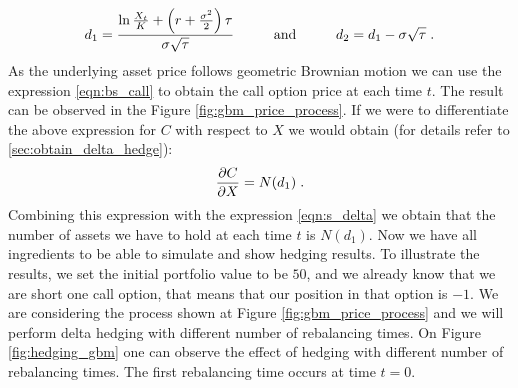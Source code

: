 \documentclass[times, utf8, diplomski]{fer}
\begin{document}
\begin{equation} \label{eqn:d1d2}
	d_1 = \frac{\ln{\frac{X_t}{K}} + \left(r + \frac{\sigma^2}{2} \right)\tau}{\sigma\sqrt{\tau}} \hspace{1cm} \mbox{and} \hspace{1cm} d_2 = d_1 - \sigma\sqrt{\tau} \hspace{0.1cm}.
\end{equation}
As the underlying asset price follows geometric Brownian motion we can use the expression \ref{eqn:bs_call} to obtain the call option price at each time $t$. The result can be observed in the Figure \ref{fig:gbm_price_process}. If we were to differentiate the above expression for $C$ with respect to $X$ we would obtain (for details refer to \ref{sec:obtain_delta_hedge}): 
\begin{equation} \label{eqn:delta_nd1}
	\frac{\partial C}{\partial X} = N(d_1) \hspace{0.1cm}.
\end{equation}
Combining this expression with the expression \ref{eqn:s_delta} we obtain that the number of assets we have to hold at each time $t$ is $N(d_1)$. Now we have all ingredients to be able to simulate and show hedging results. To illustrate the results, we set the initial portfolio value to be $50$, and we already know that we are short one call option, that means that our position in that option is $-1$. We are considering the process shown at Figure \ref{fig:gbm_price_process} and we will perform delta hedging with different number of rebalancing times. On Figure \ref{fig:hedging_gbm} one can observe the effect of hedging with different number of rebalancing times. The first rebalancing time occurs at time $t=0$. 
\end{document}
